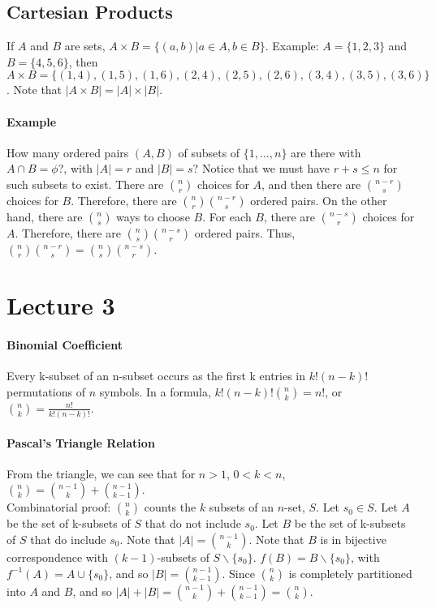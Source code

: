 \documentclass[10pt,letter]{article}
\begin{document}
\subsection*{Cartesian Products} If $A$ and $B$ are sets, $A\times B=\{(a,b)|a\in A, b\in B\}$. Example: $A=\{1,2,3\}$ and $B=\{4,5,6\}$, then $A\times B=\{(1,4),(1,5),(1,6),(2,4),(2,5),(2,6),(3,4),(3,5),(3,6)\}$. Note that $|A\times B|=|A|\times|B|$. 
\paragraph{Example} How many ordered pairs $(A,B)$ of subsets of $\{1,\ldots,n\}$ are there with $A\cap B=\phi$?, with $|A|=r$ and $|B|=s$? Notice that we must have $r+s\leq n$ for such subsets to exist. There are ${n\choose r}$ choices for $A$, and then there are ${n-r\choose s}$ choices for $B$. Therefore, there are ${n\choose r}{n-r\choose s}$ ordered pairs. On the other hand, there are ${n\choose s}$ ways to choose $B$. For each $B$, there are ${n-s\choose r}$ choices for $A$. Therefore, there are ${n\choose s}{n-s\choose r}$ ordered pairs. Thus, ${n\choose r}{n-r\choose s}={n\choose s}{n-s\choose r}$. 

\section*{Lecture 3}
\paragraph{Binomial Coefficient}
Every k-subset of an n-subset occurs as the first k entries in $k!(n-k)!$ permutations of $n$ symbols. In a formula, $k!(n-k)!{n\choose k}=n!$, or ${n\choose k}=\frac{n!}{k!(n-k)!}$. 

\paragraph{Pascal's Triangle Relation} 
From the triangle, we can see that for $n>1$, $0<k<n$, ${n\choose k}={n-1\choose k}+{n-1\choose k-1}$. \\ 
Combinatorial proof: ${n\choose k}$ counts the $k$ subsets of an $n$-set, $S$. Let $s_0\in S$. Let $A$ be the set of k-subsets of $S$ that do not include $s_0$. Let $B$ be the set of k-subsets of $S$ that do include $s_0$. Note that $|A|={n-1\choose k}$. Note that $B$ is in bijective correspondence with $(k-1)$-subsets of $S\backslash\{s_0\}$. $f(B)=B\backslash\{s_0\}$, with $f^{-1}(A)=A\cup\{s_0\}$, and so $|B|={n-1\choose k-1}$. Since ${n\choose k}$ is completely partitioned into $A$ and $B$, and so $|A|+|B|={n-1\choose k}+{n-1\choose k-1}={n\choose k}$.
\end{document}

